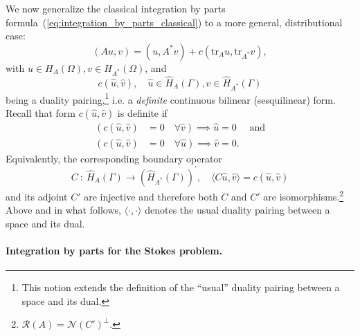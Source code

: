 We now generalize the classical integration by parts 
formula~(\ref{eq:integration_by_parts_classical}) to a more general, distributional case:
\[
(Au,v) = (u,A^\ast v) + c(\text{tr}_A u, \text{tr}_{A^\ast} v),
\label{eq:integration_by_parts}
\]
with $u \in H_A(\Omega), v \in H_{A^\ast}(\Omega)$, and 
\[
c(\hat{u},\hat{v}), \quad \hat{u} \in \widehat{H}_A(\Gamma), \hat{v} \in \widehat{H}_{A^\ast}(\Gamma) 
\]
being a duality
pairing,\footnote{This notion extends the definition of the ``usual'' duality pairing between a space and its
dual.} i.e. a {\em definite} continuous bilinear (sesquilinear) form. Recall that form $c(\hat{u},\hat{v})$
is definite if
\begin{align*}
\left(c(\hat{u},\hat{v})\right. &= \left.0\quad \forall \hat{v} \right) \implies \hat{u} = 0 \quad \text{ and} \\[8pt]
\left(c(\hat{u},\hat{v})\right. &= \left.0\quad \forall \hat{u} \right) \implies \hat{v} = 0.
\end{align*}
Equivalently, the corresponding boundary operator
\[
C \: : \: \widehat{H}_A(\Gamma) \to (\widehat{H}_{A^\ast}(\Gamma))^\prime,\quad
\langle C\hat{u},\hat{v} \rangle = c(\hat{u},\hat{v})
\]
and its adjoint $C'$ are injective and
therefore both $C$
and $C'$ are isomorphisms.\footnote{$\mathcal{R}(A) = \mathcal{N}(C')^\perp$.} Above and in what follows, $\langle \cdot,\cdot\rangle$
denotes the usual duality pairing between a space and its dual.



\paragraph*{Integration by parts for the Stokes problem.}

